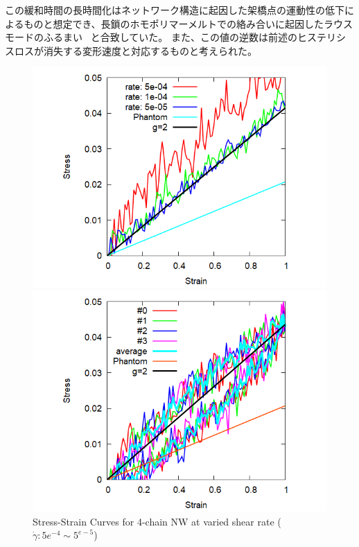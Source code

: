 \documentclass[uplatex,dvipdfmx,a4paper,10pt]{jsarticle}
\begin{document}
この緩和時間の長時間化はネットワーク構造に起因した架橋点の運動性の低下によるものと想定でき、長鎖のホモポリマーメルトでの絡み合いに起因したラウスモードのふるまい~\cite{rubinstein} と合致していた。
また、この値の逆数は前述のヒステリシスロスが消失する変形速度と対応するものと考えられた。
\vspace{-1mm}
\begin{figure}[hb]
\begin{minipage}{0.33\hsize}
    \begin{center}
        \includegraphics[width=.9\textwidth]{Shear_Random_4chain_N20_g2.png}
        \caption{Stress-Strain Curves for 4-chain NW at varied shear rate ($\dot{\gamma}: 5e^{-4} \sim 5^{e-5}$)}
        \label{fig:deform}
	\end{center}
\end{minipage}
\begin{minipage}{0.33\hsize}
	\begin{center}
        \includegraphics[width=.9\textwidth]{CyclicDeform_4chain_rate_2e-4_g2.png}

\end{center}
\end{minipage}
\end{figure}
\end{document}
